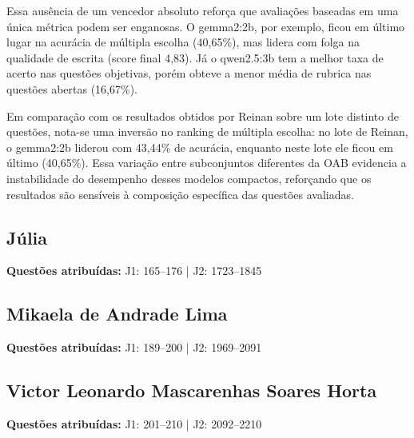 \documentclass[12pt,a4paper]{article}
\begin{document}
Essa ausência de um vencedor absoluto reforça que avaliações baseadas em uma única métrica podem ser enganosas. O gemma2:2b, por exemplo, ficou em último lugar na acurácia de múltipla escolha (40,65\%), mas lidera com folga na qualidade de escrita (score final 4,83). Já o qwen2.5:3b tem a melhor taxa de acerto nas questões objetivas, porém obteve a menor média de rubrica nas questões abertas (16,67\%).

Em comparação com os resultados obtidos por Reinan sobre um lote distinto de questões, nota-se uma inversão no ranking de múltipla escolha: no lote de Reinan, o gemma2:2b liderou com 43,44\% de acurácia, enquanto neste lote ele ficou em último (40,65\%). Essa variação entre subconjuntos diferentes da OAB evidencia a instabilidade do desempenho desses modelos compactos, reforçando que os resultados são sensíveis à composição específica das questões avaliadas.

\subsection{Júlia}

\textbf{Questões atribuídas:} J1: 165--176 | J2: 1723--1845


\subsection{Mikaela de Andrade Lima}

\textbf{Questões atribuídas:} J1: 189--200 | J2: 1969--2091


\subsection{Victor Leonardo Mascarenhas Soares Horta}

\textbf{Questões atribuídas:} J1: 201--210 | J2: 2092--2210


\end{document}
